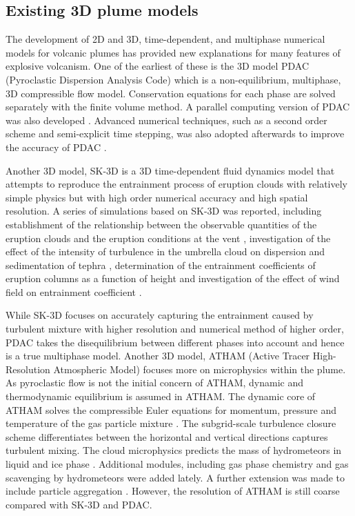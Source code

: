 \subsection{Existing 3D plume models}

The development of 2D and 3D, time-dependent, and multiphase numerical models for volcanic plumes has provided new explanations for many features of explosive volcanism. One of the earliest of these is the 3D model PDAC (Pyroclastic Dispersion Analysis Code) \citep{neri2003multiparticle}  which is a non-equilibrium, multiphase, 3D compressible flow model. Conservation equations for each phase are solved separately with the finite volume method. A parallel computing version of PDAC was also developed \citep{ongaro2007parallel}. Advanced numerical techniques, such as a second order scheme and semi-explicit time stepping, was also adopted afterwards to improve the accuracy of PDAC \citep{carcano2013semi}. 

Another 3D model, SK-3D \citep{suzuki2005numerical} is a 3D time-dependent fluid dynamics model that attempts to reproduce the entrainment process of eruption clouds with relatively simple physics but with high order numerical accuracy and high spatial resolution.
A series of simulations based on SK-3D was reported, including establishment of the relationship between the observable quantities of the eruption clouds and the eruption conditions at the vent \citep{suzuki2009three}, investigation of the effect of the intensity of turbulence in the umbrella cloud on dispersion and sedimentation of tephra \citep{koyaguchi2009effect}, determination of the entrainment coefficients of eruption columns as a function of height \citep{suzuki2010numerical} and investigation of the effect of wind field on entrainment coefficient \citep{suzuki20133d}. 

While SK-3D focuses on accurately capturing the entrainment caused by turbulent mixture with higher resolution and numerical method of higher order, PDAC takes the disequilibrium between different phases into account and hence is a true multiphase model. Another 3D model, ATHAM (Active Tracer High-Resolution Atmospheric Model) \citep{oberhuber1998volcanic} focuses more on microphysics within the plume. As pyroclastic flow is not the initial concern of ATHAM, dynamic and thermodynamic equilibrium is assumed in ATHAM. The dynamic core of ATHAM solves the compressible Euler equations for momentum, pressure and temperature of the gas particle mixture \citep{oberhuber1998volcanic}. The subgrid-scale turbulence closure scheme differentiates between the horizontal and vertical directions \citep{herzog2003prognostic} captures turbulent mixing. The cloud microphysics predicts the mass of hydrometeors in liquid and ice phase \citep{herzog1998effect}. Additional modules, including gas phase chemistry \citep{trentmann2002simulation} and gas scavenging by hydrometeors \citep{textor2003injection} were added lately. A further extension was made to include particle aggregation \citep{textor2006volcanic1, textor2006volcanic2}. However, the resolution of ATHAM is still coarse compared with SK-3D and PDAC.

